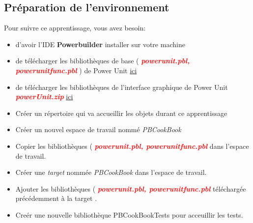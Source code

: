 \documentclass[french]{article}
\theoremstyle{definition}
\begin{document}
\subsection{Préparation de l'environnement}
Pour suivre ce apprentissage, vous avez besoin:
\begin{itemize}
    \item d'avoir l'IDE \textbf{Powerbuilder} installer sur votre machine
    \item de télécharger les bibliothèques de base ( \textcolor{red}{\textbf{\textit{powerunit.pbl, powerunitfunc.pbl}}} ) de  Power Unit  \href{https://github.com/mahugnon/PowerUnitHonore.git}{ ici} 
    \item de télécharger les bibliothèques de l'interface graphique de Power Unit  \textcolor{red}{\textbf{\textit{powerUnit.zip}}}  \href{https://github.com/mahugnon/PowerUnitHonore/releases/download/v3.1.2/powerUnit.zip}{ici} 
    \item Créer un répertoire qui va accueillir les objets durant ce apprentissage  
    \item Créer un nouvel espace de travail nommé \textit{PBCookBook} 
    \item Copier les bibliothèques ( \textcolor{red}{\textbf{\textit{powerunit.pbl, powerunitfunc.pbl}}}  dans l'espace de travail.
    \item Créer une \textit{target} nommée \textit{PBCookBook} dans l'espace de travail.
    \item Ajouter les bibliothèques ( \textcolor{red}{\textbf{\textit{powerunit.pbl, powerunitfunc.pbl}}}  téléchargée précédemment à la target  .
    \item  Creér une nouvelle bibliothèque PBCookBookTests pour acceuillir les tests.
\end{itemize}

\end{document}
